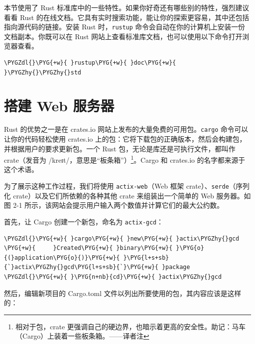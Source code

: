 本节使用了 Rust 标准库中的一些特性。如果你好奇还有哪些别的特性，强烈建议看看 Rust 的在线文档。它具有实时搜索功能，能让你的探索更容易，其中还包括指向源代码的链接。安装 Rust 时，\texttt{rustup} 命令会自动在你的计算机上安装一份文档副本。你既可以在 Rust 网站上查看标准库文档，也可以使用以下命令打开浏览器查看。

\begin{Verbatim}[commandchars=\\\{\},breaklines=true,breakanywhere=true,fontsize=\codefont,xleftmargin=17bp]
\PYGZdl{}\PYG{+w}{ }rustup\PYG{+w}{ }doc\PYG{+w}{ }\PYGZhy{}\PYGZhy{}std
\end{Verbatim}

\section{搭建 Web 服务器}

Rust 的优势之一是在 crates.io 网站上发布的大量免费的可用包。\texttt{cargo} 命令可以让你的代码轻松使用 crates.io 上的包：它将下载包的正确版本，然后会构建包，并根据用户的要求更新包。一个 Rust 包，无论是库还是可执行文件，都叫作 crate（发音为 /kreɪt/，意思是“板条箱”）\footnote{相对于包，crate 更强调自己的硬边界，也暗示着更高的安全性。助记：马车（Cargo）上装着一些板条箱。——译者注}。Cargo 和 crates.io 的名字都来源于这个术语。

为了展示这种工作过程，我们将使用 \texttt{actix-web}（Web 框架 crate）、\texttt{serde}（序列化 crate）以及它们所依赖的各种其他 crate 来组装出一个简单的 Web 服务器。如图 2-1 所示，该网站会提示用户输入两个数值并计算它们的最大公约数。


首先，让 Cargo 创建一个新包，命名为 \texttt{actix-gcd}：

\begin{Verbatim}[commandchars=\\\{\},breaklines=true,breakanywhere=true,fontsize=\codefont,xleftmargin=17bp]
\PYGZdl{}\PYG{+w}{ }cargo\PYG{+w}{ }new\PYG{+w}{ }actix\PYGZhy{}gcd
\PYG{+w}{     }Created\PYG{+w}{ }binary\PYG{+w}{ }\PYG{o}{(}application\PYG{o}{)}\PYG{+w}{ }\PYG{l+s+sb}{`}actix\PYGZhy{}gcd\PYG{l+s+sb}{`}\PYG{+w}{ }package
\PYGZdl{}\PYG{+w}{ }\PYG{n+nb}{cd}\PYG{+w}{ }actix\PYGZhy{}gcd
\end{Verbatim}

然后，编辑新项目的 Cargo.toml 文件以列出所要使用的包，其内容应该是这样的：

